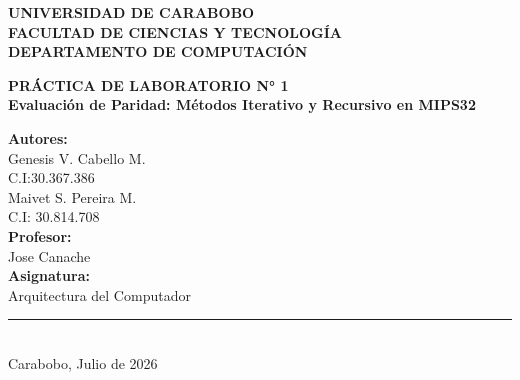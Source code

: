 \documentclass[12pt, a4paper]{article}
\begin{document}
\begin{titlepage}
    \begin{center}
        \textbf{\large UNIVERSIDAD DE CARABOBO} \\
        \textbf{\large FACULTAD DE CIENCIAS Y TECNOLOGÍA} \\
        \textbf{\large DEPARTAMENTO DE COMPUTACIÓN} \\
        \vspace*{0.5cm}
       
        \vspace*{6cm} %
        
        \textbf{\LARGE PRÁCTICA DE LABORATORIO N° 1} \\[0.4cm]
        \textbf{\Large Evaluación de Paridad: Métodos Iterativo y Recursivo en MIPS32 } \\
        
        \vspace*{6.8cm} %
        
        \begin{flushright}
            \begin{minipage}{0.5\linewidth}
                \normalsize
                \textbf{Autores:} \\
                Genesis V. Cabello M. \\
                \vspace*{0.3cm}
                C.I:30.367.386\\
                Maivet S. Pereira M.\\
                \vspace*{0.3cm}
                C.I: 30.814.708\\
                \textbf{Profesor:} \\
                \vspace*{0.3cm}
                Jose Canache \\
                \textbf{Asignatura:} \\
                Arquitectura del Computador
            \end{minipage}
        \end{flushright}
        
        \vfill %
        
        \rule{\linewidth}{0.5mm} \\ %
        \vspace*{0.2cm}
        \normalsize Carabobo, Julio de 2026
        
    \end{center}
\end{titlepage}
\end{document}
